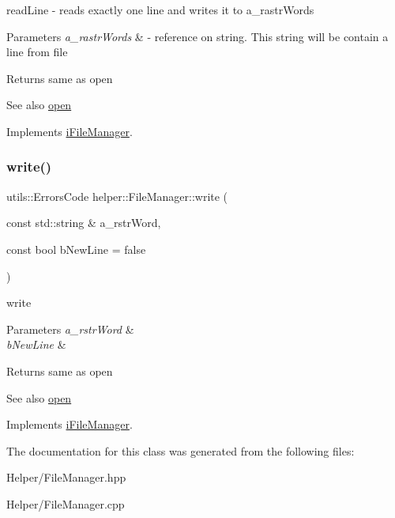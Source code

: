 read\+Line -\/ reads exactly one line and writes it to a\+\_\+rastr\+Words 


\begin{DoxyParams}{Parameters}
{\em a\+\_\+rastr\+Words} & -\/ reference on string. This string will be contain a line from file \\
\hline
\end{DoxyParams}
\begin{DoxyReturn}{Returns}
same as open 
\end{DoxyReturn}
\begin{DoxySeeAlso}{See also}
\mbox{\hyperlink{classhelper_1_1_file_manager_a0b4bac7ff95be0bdad0b70987a25b63c}{open}} 
\end{DoxySeeAlso}


Implements \mbox{\hyperlink{classi_file_manager}{i\+File\+Manager}}.

\mbox{\label{classhelper_1_1_file_manager_acfeabee081f241c4e8d5a6f181584762}} 
\subsubsection{\texorpdfstring{write()}{write()}}
{\footnotesize\ttfamily utils\+::\+Errors\+Code helper\+::\+File\+Manager\+::write (\begin{DoxyParamCaption}\item[{const std\+::string \&}]{a\+\_\+rstr\+Word,  }\item[{const bool}]{b\+New\+Line = {\ttfamily false} }\end{DoxyParamCaption})\hspace{0.3cm}{\ttfamily [virtual]}}



write 


\begin{DoxyParams}{Parameters}
{\em a\+\_\+rstr\+Word} & \\
\hline
{\em b\+New\+Line} & \\
\hline
\end{DoxyParams}
\begin{DoxyReturn}{Returns}
same as open 
\end{DoxyReturn}
\begin{DoxySeeAlso}{See also}
\mbox{\hyperlink{classhelper_1_1_file_manager_a0b4bac7ff95be0bdad0b70987a25b63c}{open}} 
\end{DoxySeeAlso}


Implements \mbox{\hyperlink{classi_file_manager}{i\+File\+Manager}}.



The documentation for this class was generated from the following files\+:\begin{DoxyCompactItemize}
\item 
Helper/File\+Manager.\+hpp\item 
Helper/File\+Manager.\+cpp\end{DoxyCompactItemize}
